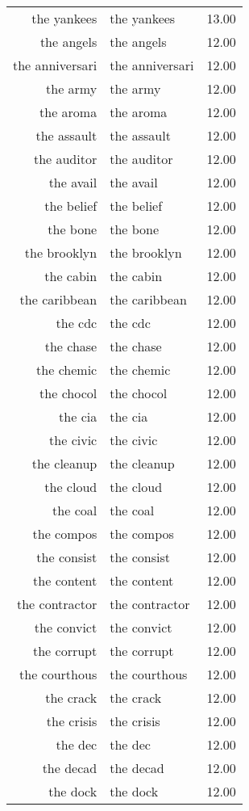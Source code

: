 \begin{table}[ht]
\begin{tabular}{rlr}
  the yankees & the yankees & 13.00 \\ 
  the angels & the angels & 12.00 \\ 
  the anniversari & the anniversari & 12.00 \\ 
  the army & the army & 12.00 \\ 
  the aroma & the aroma & 12.00 \\ 
  the assault & the assault & 12.00 \\ 
  the auditor & the auditor & 12.00 \\ 
  the avail & the avail & 12.00 \\ 
  the belief & the belief & 12.00 \\ 
  the bone & the bone & 12.00 \\ 
  the brooklyn & the brooklyn & 12.00 \\ 
  the cabin & the cabin & 12.00 \\ 
  the caribbean & the caribbean & 12.00 \\ 
  the cdc & the cdc & 12.00 \\ 
  the chase & the chase & 12.00 \\ 
  the chemic & the chemic & 12.00 \\ 
  the chocol & the chocol & 12.00 \\ 
  the cia & the cia & 12.00 \\ 
  the civic & the civic & 12.00 \\ 
  the cleanup & the cleanup & 12.00 \\ 
  the cloud & the cloud & 12.00 \\ 
  the coal & the coal & 12.00 \\ 
  the compos & the compos & 12.00 \\ 
  the consist & the consist & 12.00 \\ 
  the content & the content & 12.00 \\ 
  the contractor & the contractor & 12.00 \\ 
  the convict & the convict & 12.00 \\ 
  the corrupt & the corrupt & 12.00 \\ 
  the courthous & the courthous & 12.00 \\ 
  the crack & the crack & 12.00 \\ 
  the crisis & the crisis & 12.00 \\ 
  the dec & the dec & 12.00 \\ 
  the decad & the decad & 12.00 \\ 
  the dock & the dock & 12.00 \\ 

\end{tabular}
\end{table}
